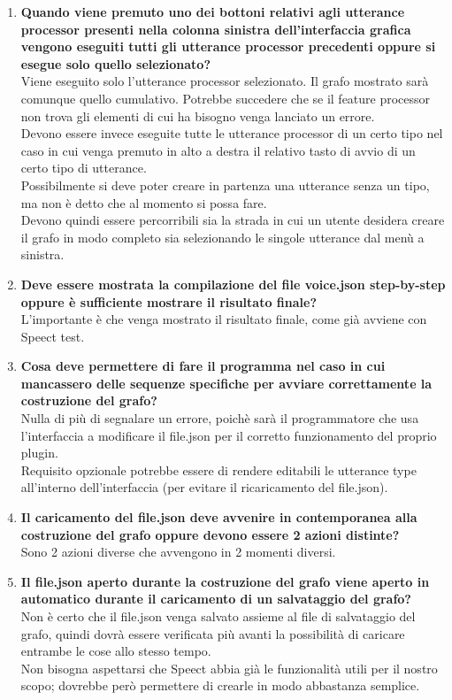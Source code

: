\documentclass[openany,12pt,a4paper]{article}
\begin{document}
\begin{enumerate}
	\item \textbf{Quando viene premuto uno dei bottoni relativi agli utterance processor presenti nella colonna sinistra dell'interfaccia grafica vengono eseguiti tutti gli utterance processor precedenti oppure si esegue solo quello selezionato?}
	\\ Viene eseguito solo l'utterance processor selezionato. Il grafo mostrato sarà comunque quello cumulativo. Potrebbe succedere che se il feature processor non trova gli elementi di cui ha bisogno venga lanciato un errore.\\ Devono essere invece eseguite tutte le utterance processor di un certo tipo nel caso in cui venga premuto in alto a destra il relativo tasto di avvio di un certo tipo di utterance. \\ Possibilmente si deve poter creare in partenza una utterance senza un tipo, ma non è detto che al momento si possa fare. \\ Devono quindi essere percorribili sia la strada in cui un utente desidera creare il grafo in modo completo sia selezionando le singole utterance dal menù a sinistra.

	\item \textbf{Deve essere mostrata la compilazione del file voice.json step-by-step oppure è sufficiente mostrare il risultato finale?} 
	\\ L'importante è che venga mostrato il risultato finale, come già avviene con Speect test.\\

	\item \textbf{Cosa deve permettere di fare il programma nel caso in cui mancassero delle sequenze specifiche per avviare correttamente la costruzione del grafo?}\\ Nulla di più di segnalare un errore, poichè sarà il programmatore che usa l'interfaccia a modificare il file.json per il corretto funzionamento del proprio plugin.
	\\ Requisito opzionale potrebbe essere di rendere editabili le utterance type all'interno dell'interfaccia (per evitare il ricaricamento del file.json).

	\item \textbf{Il caricamento del file.json deve avvenire in contemporanea alla costruzione del grafo oppure devono essere 2 azioni distinte?}\\ Sono 2 azioni diverse che avvengono in 2 momenti diversi.

	\item \textbf{Il file.json aperto durante la costruzione del grafo viene aperto in automatico durante il caricamento di un salvataggio del grafo?}\\ Non è certo che il file.json venga salvato assieme al file di salvataggio del grafo, quindi dovrà essere verificata più avanti la possibilità di caricare entrambe le cose allo stesso tempo. \\ Non bisogna aspettarsi che Speect abbia già le funzionalità utili per il nostro scopo; dovrebbe però permettere di crearle in modo abbastanza semplice.


\end{enumerate}
\end{document}
